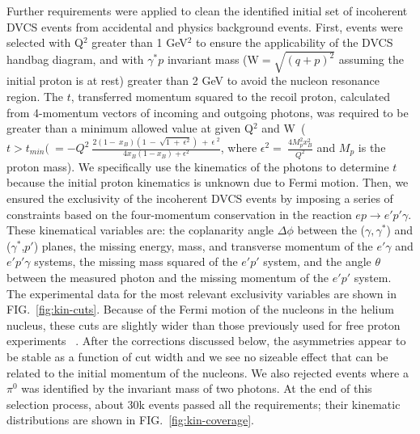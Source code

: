 \documentclass[twocolumn,nofootinbib,showpacs,prl,superscriptaddress,secnumarabic,amssymb,nobibnotes,aps,floatfix]{revtex4}
\begin{document}
Further requirements were applied to clean the identified initial set of 
incoherent DVCS events from accidental and physics background events. First, 
events were selected with Q$^{2}$ greater than 1 GeV$^2$ to ensure the 
applicability of the DVCS handbag diagram, and with $\gamma^{*}p$ invariant 
mass (W$=\sqrt{(q+p)^2}$ assuming the initial proton is at rest) greater than 2 
GeV to avoid the nucleon resonance region.  The $t$, transferred momentum 
squared to the recoil proton, calculated from 4-momentum vectors of incoming 
and outgoing photons, was required to be greater than a minimum allowed value 
at given Q$^2$ and 
W~($t>t_{min}(~=-Q^{2}~\frac{2(1-~x_{B})(1~-~\sqrt{1~+~\epsilon^{2}})~+~\epsilon~^{2}}{4x_{B}(1-x_{B})+\epsilon^{2}}$,
where $\epsilon^{2}=~\frac{4M^{2}_{p}x^{2}_{B}}{Q^{2}}$ and $M_{p}$ is the 
proton mass). We specifically use the kinematics of the photons to determine 
$t$ because the initial proton kinematics is unknown due to Fermi motion. Then, 
we ensured the exclusivity of the incoherent DVCS events by imposing 
a series of constraints based on the four-momentum conservation 
in the reaction $ep\rightarrow e'p'\gamma$. These kinematical 
variables are: the coplanarity angle $\Delta\phi$ between the 
($\gamma,\gamma^*$) and ($\gamma^*$,$p'$) planes, the missing energy, mass, and 
transverse momentum of the $e'\gamma$ and $e'p'\gamma$ systems, the missing 
mass squared of the $e'p'$ system, and the angle $\theta$ between the measured 
photon and the missing momentum of the $e'p'$ system. The experimental data for 
the most relevant exclusivity variables are shown in FIG.~\ref{fig:kin-cuts}.  
Because of the Fermi motion of the nucleons in the helium nucleus, these cuts
are slightly wider than those previously used for free proton experiments~%
\cite{Girod:2007aa}. After the corrections discussed below, the asymmetries 
appear to be stable as a function of cut width and we see no sizeable effect 
that can be related to the initial momentum of the nucleons. We also rejected 
events where a $\pi^0$ was identified by the invariant mass of two photons. At 
the end of this selection process, about 30k events passed all the 
requirements; their kinematic distributions are shown in 
FIG.~\ref{fig:kin-coverage}.  
\end{document}
